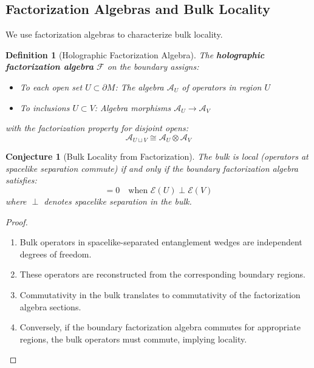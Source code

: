 \documentclass[12pt,a4paper]{article}
\newtheorem{conjecture}[theorem]{Conjecture}
\newtheorem{definition}[theorem]{Definition}
\begin{document}
\subsection{Factorization Algebras and Bulk Locality}

We use factorization algebras to characterize bulk locality.

\begin{definition}[Holographic Factorization Algebra]
The \textbf{holographic factorization algebra} $\mathcal{F}$ on the boundary assigns:
\begin{itemize}
    \item To each open set $U \subset \partial M$: The algebra $\mathcal{A}_U$ of operators in region $U$
    \item To inclusions $U \subset V$: Algebra morphisms $\mathcal{A}_U \to \mathcal{A}_V$
\end{itemize}
with the factorization property for disjoint opens:
\begin{equation}
\mathcal{A}_{U \sqcup V} \cong \mathcal{A}_U \otimes \mathcal{A}_V
\end{equation}
\end{definition}

\begin{conjecture}[Bulk Locality from Factorization]
The bulk is local (operators at spacelike separation commute) if and only if the boundary factorization algebra satisfies:
\begin{equation}
[\mathcal{F}(U), \mathcal{F}(V)] = 0 \quad \text{when } \mathcal{E}(U) \perp \mathcal{E}(V)
\end{equation}
where $\perp$ denotes spacelike separation in the bulk.
\end{conjecture}

\begin{proof}
\begin{enumerate}
    \item Bulk operators in spacelike-separated entanglement wedges are independent degrees of freedom.
    
    \item These operators are reconstructed from the corresponding boundary regions.
    
    \item Commutativity in the bulk translates to commutativity of the factorization algebra sections.
    
    \item Conversely, if the boundary factorization algebra commutes for appropriate regions, the bulk operators must commute, implying locality.
\end{enumerate}
\end{proof}
\end{document}
